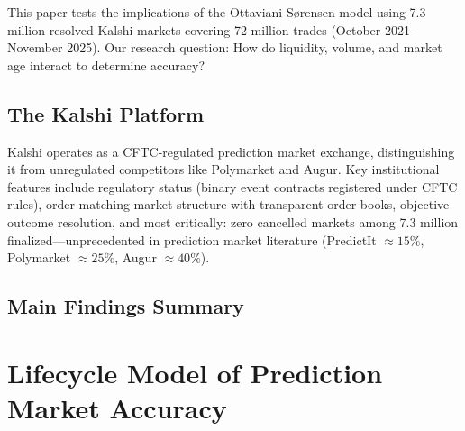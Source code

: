 \documentclass[a4paper,11pt]{article}
\theoremstyle{plain}
\theoremstyle{definition}
\begin{document}
This paper tests the implications of the Ottaviani-Sørensen model using 7.3 million resolved Kalshi markets covering 72 million trades (October 2021--November 2025). Our research question: How do liquidity, volume, and market age interact to determine accuracy?

\subsection{The Kalshi Platform}

Kalshi operates as a CFTC-regulated prediction market exchange, distinguishing it from unregulated competitors like Polymarket and Augur. Key institutional features include regulatory status (binary event contracts registered under CFTC rules), order-matching market structure with transparent order books, objective outcome resolution, and most critically: zero cancelled markets among 7.3 million finalized—unprecedented in prediction market literature (PredictIt $\approx 15\%$, Polymarket $\approx 25\%$, Augur $\approx 40\%$).

\subsection{Main Findings Summary}


\section{Lifecycle Model of Prediction Market Accuracy}
\label{sec:theory}
\end{document}
